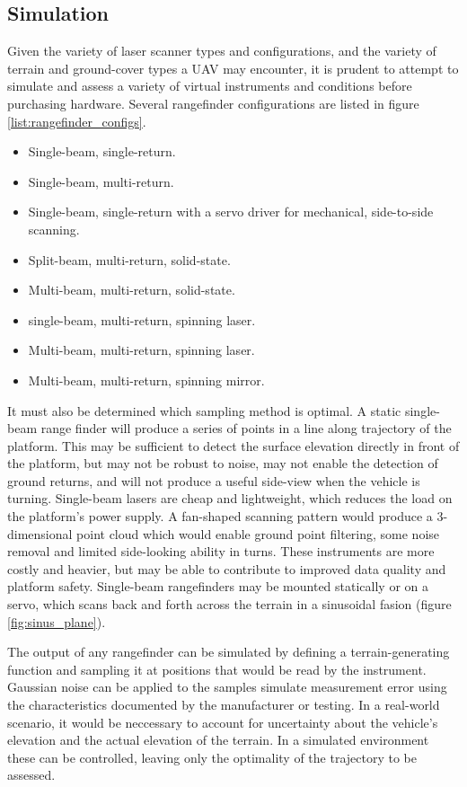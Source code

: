\documentclass[10pt,a4paper]{report}
\begin{document}
\subsection{Simulation}

Given the variety of laser scanner types and configurations, and the variety of terrain and ground-cover types a UAV may encounter, it is prudent to attempt to simulate and assess a variety of virtual instruments and conditions before purchasing hardware. Several rangefinder configurations are listed in figure \ref{list:rangefinder_configs}.

\begin{itemize}
\item Single-beam, single-return.
\item Single-beam, multi-return.
\item Single-beam, single-return with a servo driver for mechanical, side-to-side scanning.
\item Split-beam, multi-return, solid-state.
\item Multi-beam, multi-return, solid-state.
\item single-beam, multi-return, spinning laser.
\item Multi-beam, multi-return, spinning laser.
\item Multi-beam, multi-return, spinning mirror.
\label{list:rangefinder_configs}
\end{itemize}

It must also be determined which sampling method is optimal. A static single-beam range finder will produce a series of points in a line along trajectory of the platform. This may be sufficient to detect the surface elevation directly in front of the platform, but may not be robust to noise, may not enable the detection of ground returns, and will not produce a useful side-view when the vehicle is turning. Single-beam lasers are cheap and lightweight, which reduces the load on the platform's power supply. A fan-shaped scanning pattern would produce a 3-dimensional point cloud which would enable ground point filtering, some noise removal and limited side-looking ability in turns. These instruments are more costly and heavier, but may be able to contribute to improved data quality and platform safety. Single-beam rangefinders may be mounted statically or on a servo, which scans back and forth across the terrain in a sinusoidal fasion (figure \ref{fig:sinus_plane}).

The output of any rangefinder can be simulated by defining a terrain-generating function and sampling it at positions that would be read by the instrument. Gaussian noise can be applied to the samples simulate measurement error using the characteristics documented by the manufacturer or testing. In a real-world scenario, it would be neccessary to account for uncertainty about the vehicle's elevation and the actual elevation of the terrain. In a simulated environment these can be controlled, leaving only the optimality of the trajectory to be assessed.
\end{document}
